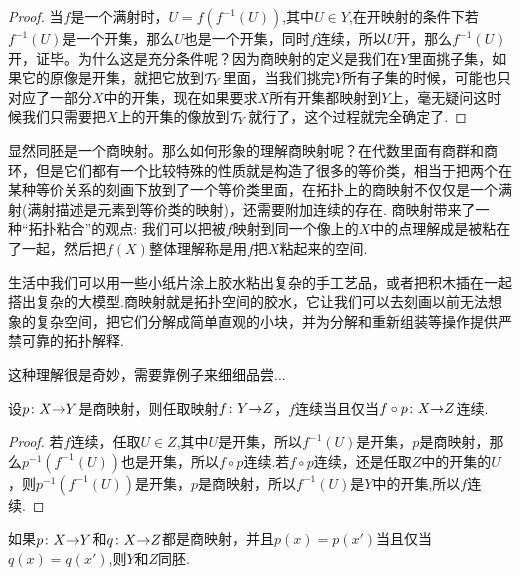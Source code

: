 \begin{proof}
当$f$是一个满射时，$U=f(f^{-1}(U))$,其中$U \in Y$,在开映射的条件下若$f^{-1}(U)$是一个开集，那么$U$也是一个开集，同时$f$连续，所以$U$开，那么$f^{-1}(U)$开，证毕。为什么这是充分条件呢？因为商映射的定义是我们在$Y$里面挑子集，如果它的原像是开集，就把它放到$\mathcal{T}_Y$里面，当我们挑完$Y$所有子集的时候，可能也只对应了一部分$X$中的开集，现在如果要求$X$所有开集都映射到$Y$上，毫无疑问这时候我们只需要把$X$上的开集的像放到$\mathcal{T}_Y$就行了，这个过程就完全确定了.
\end{proof}

显然同胚是一个商映射。那么如何形象的理解商映射呢？在代数里面有商群和商环，但是它们都有一个比较特殊的性质就是构造了很多的等价类，相当于把两个在某种等价关系的刻画下放到了一个等价类里面，在拓扑上的商映射不仅仅是一个满射(满射描述是元素到等价类的映射)，还需要附加连续的存在. 商映射带来了一种“拓扑粘合”的观点: 我们可以把被$f$映射到同一个像上的$X$中的点理解成是被粘在了一起，然后把$f(X)$整体理解称是用$f$把$X$粘起来的空间. 

生活中我们可以用一些小纸片涂上胶水粘出复杂的手工艺品，或者把积木插在一起搭出复杂的大模型.商映射就是拓扑空间的胶水，它让我们可以去刻画以前无法想象的复杂空间，把它们分解成简单直观的小块，并为分解和重新组装等操作提供严禁可靠的拓扑解释.

这种理解很是奇妙，需要靠例子来细细品尝...

\begin{theorem}
设${p}\colon{X}{\to}{Y}$是商映射，则任取映射${f}\colon{Y}{\to}{Z}$，$f$连续当且仅当${f \circ p}\colon{X}{\to}{Z}$连续.
\end{theorem}

\begin{proof}
若$f$连续，任取$U \in Z$,其中$U$是开集，所以$f^{-1}(U)$是开集，$p$是商映射，那么$p^{-1}(f^{-1}(U))$也是开集，所以$f \circ p$连续.若$f \circ p$连续，还是任取$Z$中的开集的$U$，则$p^{-1}(f^{-1}(U))$是开集，$p$是商映射，所以$f^{-1}(U)$是$Y$中的开集,所以$f$连续.
\end{proof}

\begin{theorem}
如果${p}\colon{X}{\to}{Y}$和${q}\colon{X}{\to}{Z}$都是商映射，并且$p(x)=p(x')$当且仅当$q(x)=q(x')$,则$Y$和$Z$同胚.
\begin{center}
\end{center}
\end{theorem}

